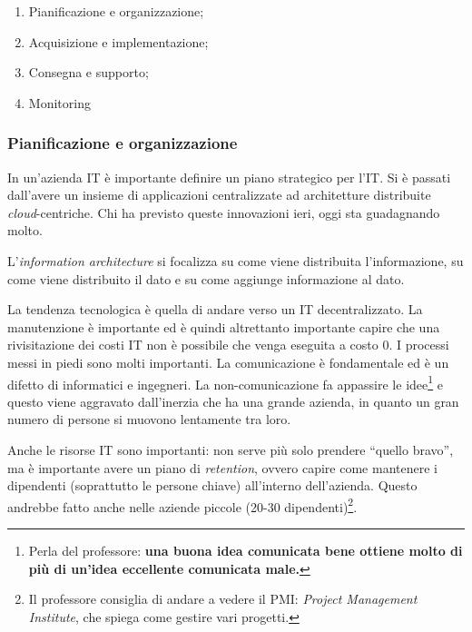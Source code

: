 \begin{enumerate}
  \item Pianificazione e organizzazione;
  \item Acquisizione e implementazione;
  \item Consegna e supporto;
  \item Monitoring
\end{enumerate}

\subsubsection{Pianificazione e organizzazione}

In un'azienda IT è importante definire un piano strategico per l'IT. Si è
passati dall'avere un insieme di applicazioni centralizzate ad architetture
distribuite
\textit{cloud}-centriche. Chi ha previsto queste innovazioni ieri, oggi sta
guadagnando molto.

L'\textit{information architecture} si focalizza su come viene distribuita
l'informazione, su come viene distribuito il dato e su come aggiunge
informazione al dato.

La tendenza tecnologica è quella di andare verso un IT decentralizzato. La
manutenzione è importante ed è quindi altrettanto importante capire che una rivisitazione
dei costi IT non è possibile che venga eseguita a costo 0. I processi messi in piedi sono
molti importanti. La comunicazione è fondamentale ed è un difetto di
informatici e ingegneri. La non-comunicazione fa appassire le
idee\footnote{Perla del professore: \textbf{una buona idea comunicata bene
ottiene molto di più di un'idea eccellente comunicata male.}} e questo viene
aggravato dall'inerzia che ha una grande azienda, in quanto un gran numero di
persone si muovono lentamente tra loro.

Anche le risorse IT sono importanti: non serve più solo prendere ``quello
bravo'', ma è importante avere un piano di \textit{retention}, ovvero capire
come mantenere i dipendenti (soprattutto le persone chiave) all'interno
dell'azienda. Questo andrebbe fatto anche nelle aziende piccole (20-30
dipendenti)\footnote{Il professore consiglia di andare a vedere il PMI:
\textit{Project Management Institute}, che spiega come gestire vari progetti.}.

